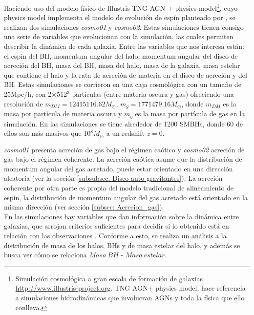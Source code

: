 Haciendo uso del modelo físico de Illustris TNG AGN + physics model\footnote{Simulación cosmológica a gran escala de formación de galaxias \url{http://www.illustris-project.org}. TNG AGN+ physics model, hace referencia a simulaciones hidrodinámicas que involucran AGNs y toda la física que ello conlleva.}, cuyo physics model implementa el modelo de evolución de espín planteado por \cite{Bustamante2018b}, se realizan dos simulaciones {\it{cosmo01}} y {\it{cosmo02}}. Estas simulaciones tienen consigo una serie de variables que evolucionan con la simulación, las cuales permiten describir la dinámica de cada galaxia.
Entre las variables que nos interesa están: el espín del BH, momentum angular del halo, momentum angular del disco de acreción del BH, masa del BH, masa del halo, masa de la galaxia, masa estelar que contiene el halo y la rata de acreción de materia en el disco de acreción y del BH. Estas simulaciones se corrieron en una caja cosmológica con un tamaño de 25Mpc/h, con 2$\times$512$^{3}$ partículas (entre materia oscura y gas) %
ofreciendo una resolución de $m_{DM}= 12415116.62 M_{\odot}$, $m_{g} = 1771479.16M_{\odot}$, donde $m_{DM}$ es la masa por partícula de materia oscura y $m_{g}$ es la masa por partícula de gas en la simulación.  %
En las simulaciones se tiene alrededor de 1200 SMBHs, donde 60 de ellos son más masivos que 10$^{8}M_{\odot}$ a un redshift $z=0$.

{\it{cosmo01}} presenta acreción de gas bajo el régimen caótico y {\it{cosmo02}} acreción de gas bajo el régimen coherente. La acreción caótica asume que la distribución de momentum angular del gas acretado, puede estar orientado en una dirección aleatoria  
(ver la sección \ref{subsubsec: Disco auto-gravitantes}). La acreción coherente por otra parte es propia del modelo tradicional de alineamiento de espín, la distribución de momentum angular del gas acretado está orientado en la misma dirección
(ver sección \ref{subsec: Acrecion_gas}).
~\\

En las simulaciones hay variables que dan información sobre la dinámica entre galaxias, que arrojan criterios suficientes para decidir si lo obtenido está en relación con
las observaciones \cite{hutsemekers2014}. 
Conforme a esto, se realiza un análisis a la distribución de masa de los halos, BHs y de masa estelar del halo, y además se busca ver cómo se relaciona $Masa\ BH$ - $Masa\ estelar$.


